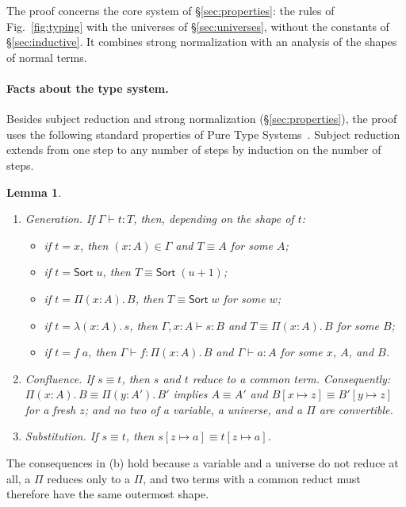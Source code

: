 \documentclass[acmsmall,screen,nonacm]{acmart}
\newtheorem{lemma}[theorem]{Lemma}
\newcommand{\Sort}[1]{\mathsf{Sort}\;#1}
\newcommand{\tPi}[3]{\Pi(#1{:}#2).\,#3}
\newcommand{\tLam}[3]{\lambda(#1{:}#2).\,#3}
\newcommand{\subst}[3]{#1[#2 \mapsto #3]}
\newcommand{\conv}{\equiv}
\begin{document}
The proof concerns the core system of \S\ref{sec:properties}: the rules of Fig.~\ref{fig:typing} with the universes of \S\ref{sec:universes}, without the constants of \S\ref{sec:inductive}.
It combines strong normalization with an analysis of the shapes of normal terms.

\paragraph{Facts about the type system.}
Besides subject reduction and strong normalization (\S\ref{sec:properties}), the proof uses the following standard properties of Pure Type Systems~\cite{barendregt1992lambda}.
Subject reduction extends from one step to any number of steps by induction on the number of steps.

\begin{lemma}
\label{lem:pts}
\leavevmode
\begin{enumerate}[label=(\alph*)]
  \item \emph{Generation.} If $\Gamma \vdash t : T$, then, depending on the shape of $t$:
    \begin{itemize}
      \item if $t = x$, then $(x : A) \in \Gamma$ and $T \conv A$ for some $A$;
      \item if $t = \Sort{u}$, then $T \conv \Sort{(u+1)}$;
      \item if $t = \tPi{x}{A}{B}$, then $T \conv \Sort{w}$ for some $w$;
      \item if $t = \tLam{x}{A}{s}$, then $\Gamma, x : A \vdash s : B$ and $T \conv \tPi{x}{A}{B}$ for some $B$;
      \item if $t = f\;a$, then $\Gamma \vdash f : \tPi{x}{A}{B}$ and $\Gamma \vdash a : A$ for some $x$, $A$, and $B$.
    \end{itemize}
  \item \emph{Confluence.} If $s \conv t$, then $s$ and $t$ reduce to a common term. Consequently:
    $\tPi{x}{A}{B} \conv \tPi{y}{A'}{B'}$ implies $A \conv A'$ and $\subst{B}{x}{z} \conv \subst{B'}{y}{z}$ for a fresh $z$;
    and no two of a variable, a universe, and a $\Pi$ are convertible.
  \item \emph{Substitution.} If $s \conv t$, then $\subst{s}{z}{a} \conv \subst{t}{z}{a}$.
\end{enumerate}
\end{lemma}

\noindent The consequences in (b) hold because a variable and a universe do not reduce at all, a $\Pi$ reduces only to a $\Pi$,
and two terms with a common reduct must therefore have the same outermost shape.
\end{document}
